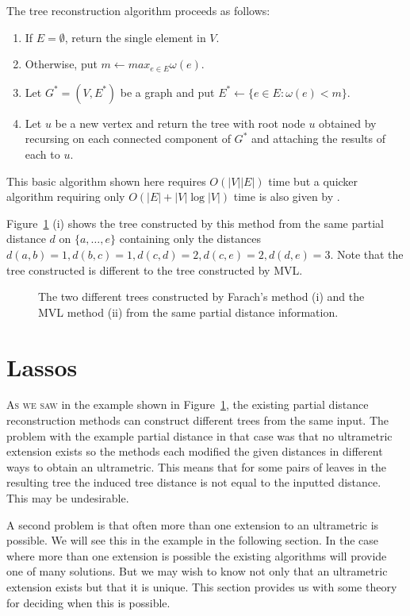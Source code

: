 The tree reconstruction algorithm proceeds as follows:
\begin{enumerate}
\item If $E = \emptyset$, return the single element in $V$.
\item Otherwise, put $m \gets max_{e \in E} \omega(e)$.
\item Let $G^* = (V,E^*)$ be a graph and put $E^* \gets \{e \in E \colon
  \omega(e) < m\}$.
\item Let $u$ be a new vertex and return the tree with root node $u$ obtained
  by recursing on each connected component of $G^*$ and attaching the results
  of each to $u$.               %
\end{enumerate}
This basic algorithm shown here requires $O(|V||E|)$ time but a quicker
algorithm requiring only $O(|E| + |V|\log |V|)$ time is also given by
\cite{farach1995robust}.

Figure~\ref{fig:farach-mvl-ex} (i) shows the tree constructed by this method
from the same partial distance $d$ on $\{a,\dotsc,e\}$ containing only the
distances $d(a,b)=1, d(b,c)=1, d(c,d)=2, d(c,e)=2, d(d,e)=3$.  Note that the
tree constructed is different to the tree constructed by MVL.

\begin{figure}
  \centering
  
  \caption{The two different trees constructed by Farach's method (i) and the
    MVL method (ii) from the same partial distance information.}
  \label{fig:farach-mvl-ex}
\end{figure}

\section{Lassos}
\label{sec:lassoing-corralling}

\textsc{As we saw} in the example shown in Figure~\ref{fig:farach-mvl-ex}, the
existing partial distance reconstruction methods can construct different trees
from the same input.  The problem with the example partial distance in that
case was that no ultrametric extension exists so the methods each modified the
given distances in different ways to obtain an ultrametric.  This means that
for some pairs of leaves in the resulting tree the induced tree distance is
not equal to the inputted distance.  This may be undesirable.

A second problem is that often more than one extension to an ultrametric is
possible.  We will see this in the example in the following section.  In the
case where more than one extension is possible the existing algorithms will
provide one of many solutions.  But we may wish to know not only that an
ultrametric extension exists but that it is unique.  This section provides us
with some theory for deciding when this is possible.

